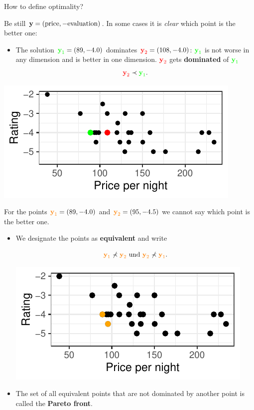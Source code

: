 \begin{frame}[allowframebreaks]{How to define optimality?}

Be still $\mathbf{y} = (\text{price}, - \text{evaluation})$. In some cases it is \textit{clear} which point is the better one:

\begin{itemize}
\item The solution $\textcolor{green}{\textbf{y}_1} = \left(89, - 4.0\right)$ dominates $\textcolor{red}{\textbf{y}_2} = \left(108, - 4.0\right)$: $\textcolor{green}{\textbf{y}_1}$ is not worse in any dimension and is better in one dimension. $\textcolor{red}{\textbf{y}_2}$ gets \textbf{dominated} of $\textcolor{green}{\textbf{y}_1}$
$$
\textcolor{red}{\textbf{y}_2} \prec \textcolor{green}{\textbf{y}_1}.
$$
\end{itemize}

\centering \includegraphics[width=0.5\linewidth]{images/expedia-3-1}

\framebreak

For the points $\textcolor{orange}{\textbf{y}_1} = \left(89, - 4.0\right)$ and $\textcolor{orange}{\textbf{y}_2} = \left(95, - 4.5\right)$ we cannot say which point is the better one.

\begin{itemize}
\item We designate the points as \textbf{equivalent} and write

$$
\textcolor{orange}{\textbf{y}_1} \not\prec \textcolor{orange}{\textbf{y}_2} \text{ und } \textcolor{orange}{\textbf{y}_2} \not\prec \textcolor{orange}{\textbf{y}_1}.
$$

\centering \includegraphics[width=0.5\linewidth]{images/expedia-4-1}


\item The set of all equivalent points that are not dominated by another point is called the \textbf{Pareto front}.


\end{itemize}
\end{frame}
